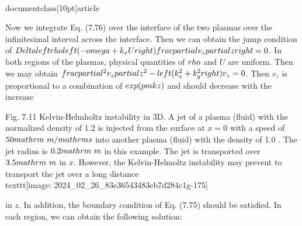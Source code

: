 \\documentclass[10pt]{article}
\begin{document}
{{{{Now we integrate Eq. (7.76) over the interface of the two plasmas over the infinitesimal interval across the interface. Then we can obtain the jump condition of $\\Delta\\left\\{\\rho\\left(-\\omega+k_{x} U\\right) \\frac{\\partial v_{z}}{\\partial z}\\right\\}=0$. In both regions of the plasmas, physical quantities of $\\rho$ and $U$ are uniform. Then we may obtain $\\frac{\\partial^{2} v_{z}}{\\partial z^{2}}-\\left(k_{x}^{2}+k_{y}^{2}\\right) v_{z}=0$. Then $v_{z}$ is proportional to a combination of $\\exp ( \\pm k z)$ and should decrease with the increase

Fig. 7.11 Kelvin-Helmholtz instability in 3D. A jet of a plasma (fluid) with the normalized density of 1.2 is injected from the surface at $x=0$ with a speed of $50 \\mathrm{~m} / \\mathrm{s}$ into another plasma (fluid) with the density of 1.0 . The jet radius is $0.2 \\mathrm{~m}$ in this example. The jet is transported over $3.5 \\mathrm{~m}$ in $x$. However, the Kelvin-Helmoltz instability may prevent to transport the jet over a long distance
\\texttt{[image: 2024\_02\_26\_83e36543483eb7d284c1g-175]}

in $z$. In addition, the boundary condition of Eq. (7.75) should be satisfied. In each region, we can obtain the following solution:

\\[
v_{z} \\propto \\begin{cases}\\left(-\\omega+k_{x} U_{1}\\right) e^{+k z} & (z<0)  \\tag{7.77}\\\\ \\left(-\\omega+k_{x} U_{2}\\right) e^{-k z} & (z>0)\\end{cases}
\\]

}}}}
\end{document}
